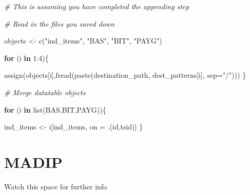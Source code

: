 \documentclass[
]{book}
\newenvironment{Shaded}{\begin{snugshade}}{\end{snugshade}}
\newcommand{\AttributeTok}[1]{\textcolor[rgb]{0.77,0.63,0.00}{#1}}
\newcommand{\CommentTok}[1]{\textcolor[rgb]{0.56,0.35,0.01}{\textit{#1}}}
\newcommand{\ControlFlowTok}[1]{\textcolor[rgb]{0.13,0.29,0.53}{\textbf{#1}}}
\newcommand{\DecValTok}[1]{\textcolor[rgb]{0.00,0.00,0.81}{#1}}
\newcommand{\FunctionTok}[1]{\textcolor[rgb]{0.00,0.00,0.00}{#1}}
\newcommand{\NormalTok}[1]{#1}
\newcommand{\OtherTok}[1]{\textcolor[rgb]{0.56,0.35,0.01}{#1}}
\newcommand{\SpecialCharTok}[1]{\textcolor[rgb]{0.00,0.00,0.00}{#1}}
\newcommand{\StringTok}[1]{\textcolor[rgb]{0.31,0.60,0.02}{#1}}
\begin{document}
\begin{Shaded}
\begin{Highlighting}[]
\CommentTok{\# This is assuming you have completed the appending step}

\CommentTok{\# Read in the files you saved down}

\NormalTok{objects }\OtherTok{\textless{}{-}} \FunctionTok{c}\NormalTok{(}\StringTok{"ind\_items"}\NormalTok{, }\StringTok{"BAS"}\NormalTok{, }\StringTok{"BIT"}\NormalTok{, }\StringTok{"PAYG"}\NormalTok{)}

\ControlFlowTok{for}\NormalTok{ (i }\ControlFlowTok{in} \DecValTok{1}\SpecialCharTok{:}\DecValTok{4}\NormalTok{)\{}
  
    \FunctionTok{assign}\NormalTok{(objects[i],}\FunctionTok{fread}\NormalTok{(}\FunctionTok{paste}\NormalTok{(destination\_path, dest\_patterns[i], }\AttributeTok{sep=}\StringTok{"/"}\NormalTok{)))}
\NormalTok{\}}

\CommentTok{\# Merge datatable objects}

\ControlFlowTok{for}\NormalTok{ (i }\ControlFlowTok{in} \FunctionTok{list}\NormalTok{(BAS,BIT,PAYG))\{}
    
\NormalTok{    ind\_items }\OtherTok{\textless{}{-}}\NormalTok{ i[ind\_items, on }\OtherTok{=}\NormalTok{ .(id,tsid)]}
\NormalTok{\}}
\end{Highlighting}
\end{Shaded}

\hypertarget{madip}{%
\chapter{MADIP}\label{madip}}

Watch this space for further info
\end{document}
